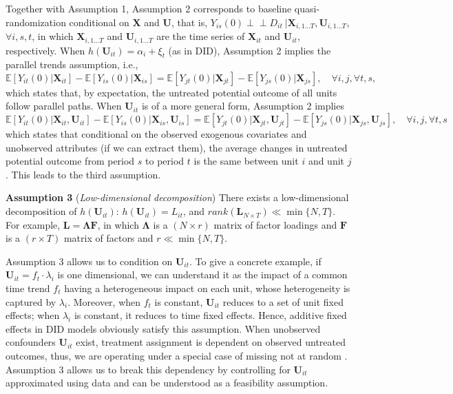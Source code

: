 \documentclass[12pt]{article}
\newcommand{\indep}{\perp \!\!\! \perp}
\newcommand{\E}{\mathbb{E}}
\begin{document}
Together with Assumption 1, Assumption 2 corresponds to baseline quasi-randomization conditional on $\mathbf{X}$ and $\mathbf{U}$, that is, $Y_{is}(0)\indep D_{it}\ |\mathbf{X}_{i,1...T}, \mathbf{U}_{i,1...T}$, $\forall i,s,t$, in which $\mathbf{X}_{i,1...T}$ and $\mathbf{U}_{i,1...T}$ are the time series of $\mathbf{X}_{it}$ and $\mathbf{U}_{it}$, respectively. When $h(\mathbf{U}_{it}) = \alpha_{i} + \xi_{t}$ (as in DID), Assumption 2 implies the parallel trends assumption, i.e., 
$$\E[Y_{it}(0)|\mathbf{X}_{it}]-\E[Y_{is}(0)|\mathbf{X}_{is}] = \E[Y_{jt}(0)|\mathbf{X}_{jt}]-\E[Y_{js}(0)|\mathbf{X}_{js}],\quad \forall i, j, \forall t, s,$$
which states that, by expectation, the untreated potential outcome of all units follow parallel paths. When $\mathbf{U}_{it}$ is of a more general form, Assumption 2 implies 
$$
\E[Y_{it}(0)|\mathbf{X}_{it}, \mathbf{U}_{it}]-\E[Y_{is}(0)|\mathbf{X}_{is}, \mathbf{U}_{is}] = \E[Y_{jt}(0)|\mathbf{X}_{jt}, \mathbf{U}_{jt}]-\E[Y_{js}(0)|\mathbf{X}_{js},\mathbf{U}_{js}],\quad \forall i, j, \forall t, s
$$
which states that conditional on the observed exogenous covariates and unobserved attributes (if we can extract them), the average changes in untreated potential outcome from period $s$ to period $t$ is the same between unit $i$ and unit $j$. This leads to the third assumption.

\bigskip\noindent\textbf{Assumption 3}  ({\it Low-dimensional decomposition}) There exists a low-dimensional decomposition of $h(\mathbf{U}_{it})$: $h(\mathbf{U}_{it}) = L_{it}$, and $rank(\mathbf{L}_{N \times T}) \ll \min\{N, T\}$. For example, $\mathbf{L} = \mathbf{\Lambda}\mathbf{F}$, in which $\mathbf{\Lambda}$ is a $(N\times r)$ matrix of factor loadings and $\mathbf{F}$ is a $(r\times T)$ matrix of factors and $r \ll \min\{N, T\}$.\bigskip

Assumption 3 allows us to condition on $\mathbf{U}_{it}$. To give a concrete example, if $\mathbf{U}_{it} = f_{t} \cdot \lambda_{i}$ is one dimensional, we can understand it as the impact of a common time trend $f_{t}$ having a heterogeneous impact on each unit, whose heterogeneity is captured by $\lambda_{i}$. Moreover, when $f_{t}$ is constant, $\mathbf{U}_{it}$ reduces to a set of unit fixed effects; when $\lambda_{i}$ is constant, it reduces to time fixed effects. Hence, additive fixed effects in DID models obviously satisfy this assumption. When unobserved confounders $\mathbf{U}_{it}$ exist, treatment assignment is dependent on observed untreated outcomes, thus, we are operating under a special case of missing not at random \citep{rubin1976inference}. Assumption 3 allows us to break this dependency by controlling for $\mathbf{U}_{it}$ approximated using data and can be understood as a feasibility assumption.
\end{document}
